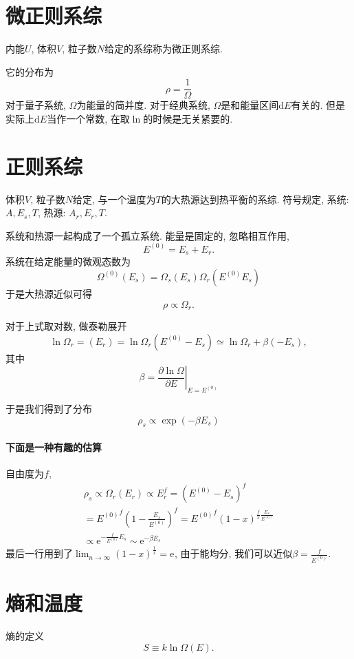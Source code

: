 \section{微正则系综}
内能$U$, 体积$V$, 粒子数$N$给定的系综称为微正则系综.

它的分布为
\begin{equation}
  \rho =\frac{1}{\Omega}
\end{equation}
对于量子系统, $\Omega$为能量的简并度. 对于经典系统, $\Omega$是和能量区间$\mathrm{d} E$有关的. 但是实际上$\mathrm{d} E$当作一个常数, 在取$\ln$的时候是无关紧要的.

\section{正则系综}
体积$V$, 粒子数$N$给定, 与一个温度为$T$的大热源达到热平衡的系综.
符号规定, 系统: $A, E_{s}, T$, 热源: $A_r, E_r,T$.

系统和热源一起构成了一个孤立系统. 能量是固定的, 忽略相互作用,
\begin{equation}
  E^{(0)}=E_s+E_r.
\end{equation}
系统在给定能量的微观态数为
\begin{equation}
  \Omega^{(0)}(E_s)=\Omega_s(E_s) \Omega_r(E^{(0)}E_s)
\end{equation}
于是大热源近似可得
\begin{equation}
  \rho \propto \Omega_r.
\end{equation}

对于上式取对数, 做泰勒展开
\begin{equation}
  \ln \Omega_r = (E_r) = \ln \Omega_r(E^{(0)}-E_s) \simeq \ln \Omega_r + \beta (- E_s),
\end{equation}
其中
\begin{equation}
  \beta =\left. \frac{\partial \ln \Omega}{\partial E} \right|_{E=E^{(0)}}
\end{equation}

于是我们得到了分布
\begin{equation}
  \rho_s \propto \exp(-\beta E_s)
\end{equation}

\paragraph{下面是一种有趣的估算}
自由度为$f$, 
\begin{equation}
  \begin{gathered}
    \rho_s \propto \Omega_r(E_r)\propto E_r^{f} =\left( E^{(0)}-E_s \right) ^{f}
    \\
    = {E^{(0)}}^{f} \left( 1 - \frac{E_s}{E^{(0)}} \right)^{f} 
    = {E^{(0)}}^{f} \left( 1-x \right)^{\frac{f}{x} \frac{E_s}{E^{(0)}}} 
    \\
    \propto \mathrm{e}^{-\frac{f}{E^{(0)}}E_s} \sim \mathrm{e}^{-\beta E_s}
  \end{gathered}
\end{equation}
最后一行用到了$\displaystyle \lim_{n \to \infty} \left( 1-x \right) ^{\frac{1}{x}} = \mathrm{e}^{}$, 由于能均分, 我们可以近似$\beta = \frac{f}{E^{(0)}}$.

\section{熵和温度}
熵的定义
\begin{equation}
  S \equiv k\ln\Omega(E).
\end{equation}
